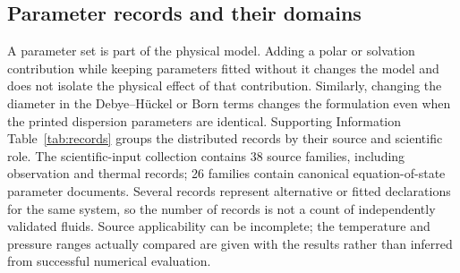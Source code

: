 \subsection{Parameter records and their domains}
A parameter set is part of the physical model.
Adding a polar or solvation contribution while keeping parameters fitted without it changes the model and does not isolate the physical effect of that contribution.
Similarly, changing the diameter in the Debye--H\"uckel or Born terms changes the formulation even when the printed dispersion parameters are identical.
Supporting Information Table~\ref{tab:records} groups the distributed records by their source and scientific role.
The scientific-input collection contains 38 source families, including observation and thermal records; 26 families contain canonical equation-of-state parameter documents.
Several records represent alternative or fitted declarations for the same system, so the number of records is not a count of independently validated fluids.
Source applicability can be incomplete; the temperature and pressure ranges actually compared are given with the results rather than inferred from successful numerical evaluation.
